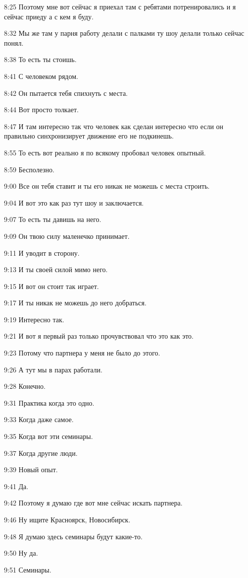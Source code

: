8:25
Поэтому мне вот сейчас я приехал там с ребятами потренировались и я сейчас приеду а с кем я буду.

8:32
Мы же там у парня работу делали с палками ту шоу делали только сейчас понял.

8:38
То есть ты стоишь.

8:41
С человеком рядом.

8:42
Он пытается тебя спихнуть с места.

8:44
Вот просто толкает.

8:47
И там интересно так что человек как сделан интересно что если он правильно синхронизирует движение его не подкинешь.

8:55
То есть вот реально я по всякому пробовал человек опытный.

8:59
Бесполезно.

9:00
Все он тебя ставит и ты его никак не можешь с места строить.

9:04
И вот это как раз тут шоу и заключается.

9:07
То есть ты давишь на него.

9:09
Он твою силу маленечко принимает.

9:11
И уводит в сторону.

9:13
И ты своей силой мимо него.

9:15
И вот он стоит так играет.

9:17
И ты никак не можешь до него добраться.

9:19
Интересно так.

9:21
И вот я первый раз только прочувствовал что это как это.

9:23
Потому что партнера у меня не было до этого.

9:26
А тут мы в парах работали.

9:28
Конечно.

9:31
Практика когда это одно.

9:33
Когда даже самое.

9:35
Когда вот эти семинары.

9:37
Когда другие люди.

9:39
Новый опыт.

9:41
Да.

9:42
Поэтому я думаю где вот мне сейчас искать партнера.

9:46
Ну ищите Красноярск, Новосибирск.

9:48
Я думаю здесь семинары будут какие-то.

9:50
Ну да.

9:51
Семинары.

